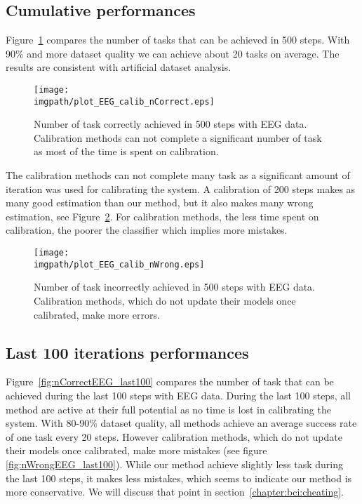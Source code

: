 \subsection{Cumulative performances}

Figure~\ref{fig:nCorrectEEG} compares the number of tasks that can be achieved in 500 steps. With 90\% and more dataset quality we can achieve about 20 tasks on average. The results are consistent with artificial dataset analysis.

\begin{figure}[!htbp]
\centering
\texttt{[image: \\imgpath/plot\_EEG\_calib\_nCorrect.eps]}
\caption{Number of task correctly achieved in 500 steps with EEG data. Calibration methods can not complete a significant number of task as most of the time is spent on calibration.}
\label{fig:nCorrectEEG}
\end{figure} 

The calibration methods can not complete many task as a significant amount of iteration was used for calibrating the system. A calibration of 200 steps makes as many good estimation than our method, but it also makes many wrong estimation, see Figure~\ref{fig:nWrongEEG}. For calibration methods, the less time spent on calibration, the poorer the classifier which implies more mistakes.

\begin{figure}[!htbp]
\centering
\texttt{[image: \\imgpath/plot\_EEG\_calib\_nWrong.eps]}
\caption{Number of task incorrectly achieved in 500 steps with EEG data. Calibration methods, which do not update their models once calibrated, make more errors.}
\label{fig:nWrongEEG}
\end{figure}

\subsection{Last 100 iterations performances}

Figure~\ref{fig:nCorrectEEG_last100} compares the number of task that can be achieved during the last 100 steps with EEG data. During the last 100 steps, all method are active at their full potential as no time is lost in calibrating the system. With 80-90\% dataset quality, all methods achieve an average success rate of one task every 20 steps. However calibration methods, which do not update their models once calibrated, make more mistakes (see figure \ref{fig:nWrongEEG_last100}). While our method achieve slightly less task during the last 100 steps, it makes less mistakes, which seems to indicate our method is more conservative. We will discuss that point in section~\ref{chapter:bci:cheating}.

